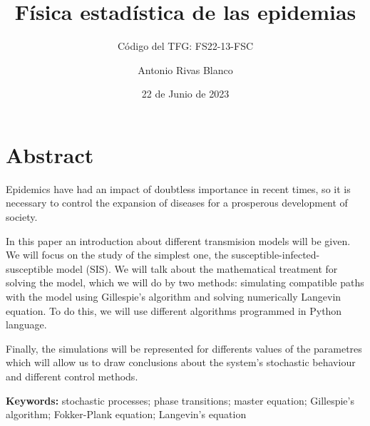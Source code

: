\documentclass[fontsize=11bp]{beamer}
\title{Física estadística de las epidemias}
\subtitle{Código del TFG: FS22-13-FSC}
\author{Antonio Rivas Blanco}
\date{22 de Junio de 2023}
\begin{document}
\renewcommand{\figurename}{ } %

\begin{frame}
    \tableofcontents[sectionstyle=show,subsectionstyle=show/shaded/hide,subsubsectionstyle=show/shaded/hide]
\end{frame}

\section{Abstract}
\begin{frame}
\small Epidemics have had an impact of doubtless importance in recent times, so it is necessary to control the expansion of 
diseases for a prosperous development of society.

In this paper an introduction about different transmision models will be given. We will focus on the study of the 
simplest one, the susceptible-infected-susceptible model \textcolor{Azul}{(SIS)}. We will talk about the mathematical treatment for 
solving the model, which we will do by two methods: simulating compatible paths with the model using \textcolor{Azul}{Gillespie's algorithm} and solving numerically 
\textcolor{Azul}{Langevin equation}. To do this, we will use different algorithms programmed in \textcolor{Azul}{Python} language.

Finally, the simulations will be represented for differents values of the parametres which will allow us to draw conclusions 
about the system's stochastic behaviour and different control methods.\newline

\textbf{Keywords:} stochastic processes; phase transitions; master equation; Gillespie's algorithm; Fokker-Plank equation; Langevin's equation
\end{frame}
\end{document}
